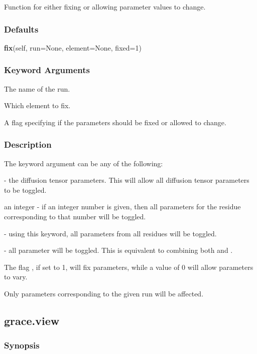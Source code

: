 Function for either fixing or allowing parameter values to change.

\subsubsection{Defaults}

\textsf{\textbf{fix}(self, run=None, element=None, fixed=1)}


\subsubsection{Keyword Arguments}


  The name of the run.

  Which element to fix.

  A flag specifying if the parameters should be fixed or allowed to change.

\subsubsection{Description}

The keyword argument 
 can be any of the following:

 - the diffusion tensor parameters.  This will allow all diffusion tensor parameters
to be toggled.

an integer - if an integer number is given, then all parameters for the residue
corresponding to that number will be toggled.

 - using this keyword, all parameters from all residues will be toggled.

 - all parameter will be toggled.  This is equivalent to combining both 
 and
.


The flag 
, if set to 1, will fix parameters, while a value of 0 will allow parameters
to vary.


Only parameters corresponding to the given run will be affected.


\newpage

\subsection{grace.view}


\subsubsection{Synopsis}

